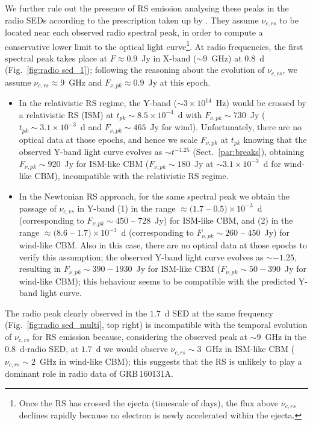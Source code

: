 \documentclass{aa}
\begin{document}
We further rule out the presence of RS emission analysing these peaks in the radio SEDs according to the prescription taken up by \citet{Laskar18c}.
They assume $\nu_{c,rs}$ to be located near each observed radio spectral peak, in order to compute a conservative lower limit to the optical light curve\footnote{Once the RS has crossed the ejecta (timescale of days), the flux above $\nu_{c,rs}$ declines rapidly because no electron is newly accelerated within the ejecta.}.
%
At radio frequencies, the first spectral peak takes place at $F \approx 0.9$~Jy in X-band ($\sim 9$~GHz) at $0.8$~d (Fig.~\ref{fig:radio sed_1}); following the reasoning about the evolution of $\nu_{c,rs}$, we assume $\nu_{c,rs} \approx 9$~GHz and $F_{\nu,pk} \approx 0.9$~Jy at this epoch.
%
\begin{itemize}
    \item In the relativistic RS regime, the Y-band ($\sim 3 \times 10^{14}$~Hz) would be crossed by a relativistic RS (ISM) at $t_{pk} \sim 8.5 \times 10^{-4}$~d with $F_{\nu,pk} \sim 730$~Jy ($t_{pk} \sim 3.1 \times 10^{-3}$~d and $F_{\nu,pk} \sim 465$~Jy for wind).
    Unfortunately, there are no optical data at those epochs, and hence we scale $F_{\nu,pk}$ at $t_{pk}$ knowing that the observed Y-band light curve evolves as $\sim t^{-1.25}$ (Sect.~\ref{par:breaks}), obtaining $F_{\nu,pk} \sim 920$~Jy for ISM-like CBM ($F_{\nu,pk} \sim 180$~Jy at $\sim 3.1 \times 10^{-3}$~d for wind-like CBM), incompatible with the relativistic RS regime.
    \item In the Newtonian RS approach, for the same spectral peak we obtain the passage of $\nu_{c,rs}$ in Y-band (1) in the range $\approx (1.7$ -- $0.5) \times 10^{-3}$~d (corresponding to $F_{\nu,pk} \sim 450$ -- $728$~Jy) for ISM-like CBM, and (2) in the range $\approx (8.6$ -- $1.7) \times 10^{-3}$~d (corresponding to $F_{\nu,pk} \sim 260$ -- $450$~Jy) for wind-like CBM.
    Also in this case, there are no optical data at those epochs to verify this assumption; the observed Y-band light curve evolves as $\sim -1.25$, resulting in $F_{\nu,pk} \sim 390 - 1930$~Jy for ISM-like CBM ($F_{\nu,pk} \sim 50 - 390$~Jy for wind-like CBM); this behaviour seems to be compatible with the predicted Y-band light curve.
\end{itemize}
%
The radio peak clearly observed in the $1.7$~d SED at the same frequency (Fig.~\ref{fig:radio sed_multi}, top right) is incompatible with the temporal evolution of $\nu_{c,rs}$ for RS emission because, considering the observed peak at $\sim 9$~GHz in the $0.8$~d-radio SED, at $1.7$~d we would observe $\nu_{c,rs} \sim 3$~GHz in ISM-like CBM ($\nu_{c,rs} \sim 2$~GHz in wind-like CBM);
this suggests that the RS is unlikely to play a dominant role in radio data of GRB\,160131A.
\end{document}
